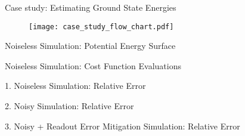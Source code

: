 \begin{frame}{Case study: Estimating Ground State Energies}
  \vspace{-5mm}
  \begin{figure}
    \centering
    \texttt{[image: case\_study\_flow\_chart.pdf]}
  \end{figure}
\end{frame}

\begin{frame}{Noiseless Simulation: Potential Energy Surface}
    \vfill
    \begin{figure}
      \noindent{}
    \end{figure}
    \vfill
\end{frame}

\begin{frame}{Noiseless Simulation: Cost Function Evaluations}
    \vfill
    \begin{figure}
      \noindent{}
    \end{figure}
    \vfill
\end{frame}

\begin{frame}{1. Noiseless Simulation: Relative Error}
    \vfill
    \begin{figure}
      \noindent{}
    \end{figure}
    \vfill
\end{frame}

\begin{frame}{2. Noisy Simulation: Relative Error}
    \vfill
    \begin{figure}
      \noindent{}
    \end{figure}
    \vfill
\end{frame}

\begin{frame}{3. Noisy + Readout Error Mitigation Simulation: Relative Error}
    \vfill
    \begin{figure}
      \noindent{}
    \end{figure}
    \vfill
\end{frame}

